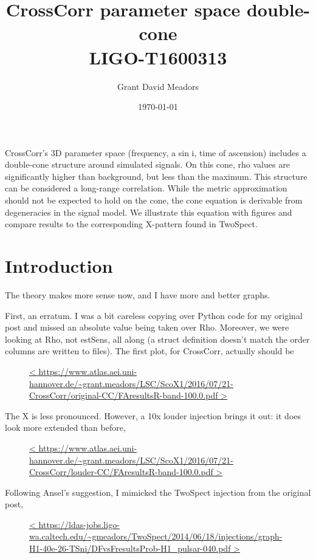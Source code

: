 \documentclass{article}
\begin{document}
\title{CrossCorr parameter space double-cone \\ 
LIGO-T1600313}
\author{Grant David Meadors}
\date{\today}

\maketitle

CrossCorr's 3D parameter space (frequency, a sin i, time of ascension) includes a double-cone structure around simulated signals. On this cone, rho values are significantly higher than background, but less than the maximum. This structure can be considered a long-range correlation. While the metric approximation should not be expected to hold on the cone, the cone equation is derivable from degeneracies in the signal model. We illustrate this equation with figures and compare results to the corresponding X-pattern found in TwoSpect.

\section{Introduction}


The theory makes more sense now, and I have more and better graphs.

First, an erratum. I was a bit careless copying over Python code for my
original post and missed an absolute value being taken over Rho.
Moreover, we were looking at Rho, not estSens, all along (a struct
definition doesn't match the order columns are written to files). The
first plot, for CrossCorr, actually should be

\begin{figure}
\caption{
\url{<
https://www.atlas.aei.uni-hannover.de/~grant.meadors/LSC/ScoX1/2016/07/21-CrossCorr/original-CC/FAresultsR-band-100.0.pdf
>}
}
\end{figure}

The X is less pronounced. However, a 10x louder injection brings it out:
it does look more extended than before,

\begin{figure}
\caption{
\url{<
https://www.atlas.aei.uni-hannover.de/~grant.meadors/LSC/ScoX1/2016/07/21-CrossCorr/louder-CC/FAresultsR-band-100.0.pdf
>}
}
\end{figure}

Following Ansel's suggestion, I mimicked the TwoSpect injection from the
original post,

\begin{figure}
\caption{
\url{<
https://ldas-jobs.ligo-wa.caltech.edu/~gmeadors/TwoSpect/2014/06/18/injections/graph-H1-40e-26-TSni/DFvsFresultsProb-H1\_pulsar-040.pdf
>}
}
\end{figure}
\end{document}
